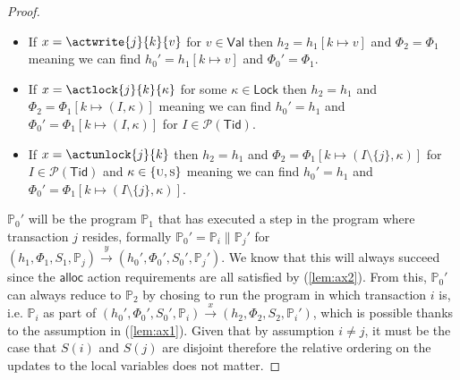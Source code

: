\begin{proof}
\begin{itemize}
	\item If $x = \actwrite{j}{k}{v}$ for $v \in \mathsf{Val}$ then $h_2 = h_1[k \mapsto v]$ and $\Phi_2 = \Phi_1$ meaning we can find $h_0' = h_1[k \mapsto v]$ and $\Phi_0' = \Phi_1$.
	
	\item If $x = \actlock{j}{k}{\kappa}$ for some $\kappa \in \mathsf{Lock}$ then $h_2 = h_1$ and $\Phi_2 = \Phi_1[k \mapsto (I, \kappa)]$ meaning we can find $h_0' = h_1$ and $\Phi_0' = \Phi_1[k \mapsto (I, \kappa)]$ for $I \in \mathcal{P}(\mathsf{Tid})$.
	
	\item If $x = \actunlock{j}{k}$ then $h_2 = h_1$ and $\Phi_2 = \Phi_1[k \mapsto (I \setminus \{j\}, \kappa)]$ for $I \in \mathcal{P}(\mathsf{Tid})$ and $\kappa \in \{\textsc{u}, \textsc{s}\}$ meaning we can find $h_0' = h_1$ and $\Phi_0' = \Phi_1[k \mapsto (I \setminus \{j\}, \kappa)]$.
\end{itemize}
$\mathds{P}_0'$ will be the program $\mathds{P}_1$ that has executed a step in the program where transaction $j$ resides, formally $\mathds{P}_0' = \mathds{P}_i \| \mathds{P}_j'$ for $(h_1, \Phi_1, S_1, \mathds{P}_j) \xrightarrow{y} (h_0', \Phi_0', S_0', \mathds{P}_j')$. We know that this will always succeed since the $\mathsf{alloc}$ action requirements are all satisfied by (\ref{lem:ax2}). From this, $\mathds{P}_0'$ can always reduce to $\mathds{P}_2$ by chosing to run the program in which transaction $i$ is, i.e. $\mathds{P}_i$ as part of $(h_0', \Phi_0', S_0', \mathds{P}_i) \xrightarrow{x} (h_2, \Phi_2, S_2, \mathds{P}_i')$, which is possible thanks to the assumption in (\ref{lem:ax1}). Given that by assumption $i \neq j$, it must be the case that $S(i)$ and $S(j)$ are disjoint therefore the relative ordering on the updates to the local variables does not matter.
\end{proof}

